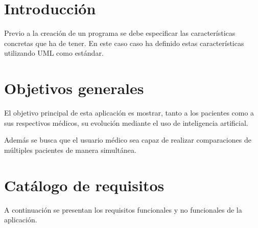 \newcommand{\cu}[9]{
    \begin{table}[p]
        \centering
        \begin{tabularx}{\linewidth}{ p{0.21\columnwidth} p{0.71\columnwidth} }
            \toprule
            \textbf{CU-#1} & \textbf{#2} \\
            \toprule
            \textbf{Versión} & 1.0 \\
            \textbf{Autor} & \theauthor \\
            \textbf{Requisitos asociados} & #3 \\
            \textbf{Descripción} & #4 \\
            \textbf{Precondición} & #5 \\
            \textbf{Acciones} & #6 \\
            \textbf{Postcondición} & #7 \\
            \textbf{Excepciones} & #8 \\
			\textbf{Importancia} & #9 \\
            \bottomrule
        \end{tabularx}
        \caption{CU-#1 #2.}
    \end{table}
}


\section{Introducción}
Previo a la creación de un programa se debe especificar las características concretas que ha de tener.
En este caso caso ha definido estas características utilizando UML como estándar.



\section{Objetivos generales}
El objetivo principal de esta aplicación es mostrar, tanto a los pacientes como a sus respectivos médicos, su evolución mediante el uso de inteligencia artificial.

Además se busca que el usuario médico sea capaz de realizar comparaciones de múltiples pacientes de manera simultánea.

\section{Catálogo de requisitos}
A continuación se presentan los requisitos funcionales y no funcionales de la aplicación.
